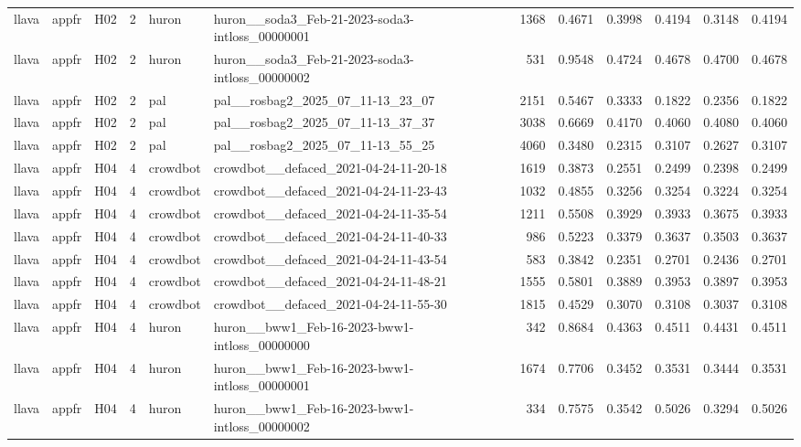 \begin{table}[tbp]
\begin{tabular}{lllrllrrrrrr}
llava & appfr & H02 & 2 & huron & huron\_\_soda3\_Feb-21-2023-soda3-intloss\_00000001 & 1368 & 0.4671 & 0.3998 & 0.4194 & 0.3148 & 0.4194 \\
llava & appfr & H02 & 2 & huron & huron\_\_soda3\_Feb-21-2023-soda3-intloss\_00000002 & 531 & 0.9548 & 0.4724 & 0.4678 & 0.4700 & 0.4678 \\
llava & appfr & H02 & 2 & pal & pal\_\_rosbag2\_2025\_07\_11-13\_23\_07 & 2151 & 0.5467 & 0.3333 & 0.1822 & 0.2356 & 0.1822 \\
llava & appfr & H02 & 2 & pal & pal\_\_rosbag2\_2025\_07\_11-13\_37\_37 & 3038 & 0.6669 & 0.4170 & 0.4060 & 0.4080 & 0.4060 \\
llava & appfr & H02 & 2 & pal & pal\_\_rosbag2\_2025\_07\_11-13\_55\_25 & 4060 & 0.3480 & 0.2315 & 0.3107 & 0.2627 & 0.3107 \\
llava & appfr & H04 & 4 & crowdbot & crowdbot\_\_defaced\_2021-04-24-11-20-18 & 1619 & 0.3873 & 0.2551 & 0.2499 & 0.2398 & 0.2499 \\
llava & appfr & H04 & 4 & crowdbot & crowdbot\_\_defaced\_2021-04-24-11-23-43 & 1032 & 0.4855 & 0.3256 & 0.3254 & 0.3224 & 0.3254 \\
llava & appfr & H04 & 4 & crowdbot & crowdbot\_\_defaced\_2021-04-24-11-35-54 & 1211 & 0.5508 & 0.3929 & 0.3933 & 0.3675 & 0.3933 \\
llava & appfr & H04 & 4 & crowdbot & crowdbot\_\_defaced\_2021-04-24-11-40-33 & 986 & 0.5223 & 0.3379 & 0.3637 & 0.3503 & 0.3637 \\
llava & appfr & H04 & 4 & crowdbot & crowdbot\_\_defaced\_2021-04-24-11-43-54 & 583 & 0.3842 & 0.2351 & 0.2701 & 0.2436 & 0.2701 \\
llava & appfr & H04 & 4 & crowdbot & crowdbot\_\_defaced\_2021-04-24-11-48-21 & 1555 & 0.5801 & 0.3889 & 0.3953 & 0.3897 & 0.3953 \\
llava & appfr & H04 & 4 & crowdbot & crowdbot\_\_defaced\_2021-04-24-11-55-30 & 1815 & 0.4529 & 0.3070 & 0.3108 & 0.3037 & 0.3108 \\
llava & appfr & H04 & 4 & huron & huron\_\_bww1\_Feb-16-2023-bww1-intloss\_00000000 & 342 & 0.8684 & 0.4363 & 0.4511 & 0.4431 & 0.4511 \\
llava & appfr & H04 & 4 & huron & huron\_\_bww1\_Feb-16-2023-bww1-intloss\_00000001 & 1674 & 0.7706 & 0.3452 & 0.3531 & 0.3444 & 0.3531 \\
llava & appfr & H04 & 4 & huron & huron\_\_bww1\_Feb-16-2023-bww1-intloss\_00000002 & 334 & 0.7575 & 0.3542 & 0.5026 & 0.3294 & 0.5026 \\

\end{tabular}
\end{table}
